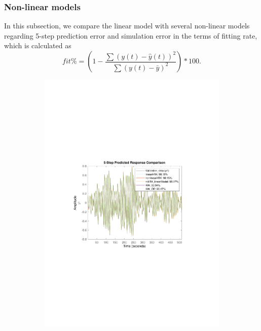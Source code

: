 \documentclass[]{article}
\begin{document}
\subsubsection{Non-linear models}

In this subsection, we compare the linear model with several non-linear models regarding 5-step prediction error and simulation error in the terms of fitting rate, which is calculated as
\begin{equation}
	fit\% = (1-\frac{\sum(y(t)-\hat{y}(t))^2}{\sum(y(t)-\bar{y})^2})*100.
\end{equation}

\begin{figure}[ht]
\centering
\begin{subfigure}{.49\textwidth}
	\centering
	\includegraphics[trim= 10cm 8cm 10cm 8cm, scale=0.4]{figures/predictions_nl.pdf}
\end{subfigure}

\end{figure}
\end{document}
